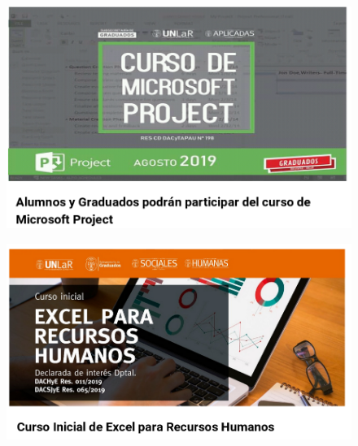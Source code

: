 \documentclass{fancyslides}
\begin{document}
\begin{frame}
\begin{figure}
	\centering
	\includegraphics[width=1\linewidth]{images/msproject}
	\caption{}
	\label{fig:msproject}
\end{figure}
\end{frame}

\begin{frame}
\begin{figure}
	\centering
	\includegraphics[width=1\linewidth]{images/excel2}
	\caption{}
	\label{fig:excel2}
\end{figure}

\end{frame}
\end{document}
